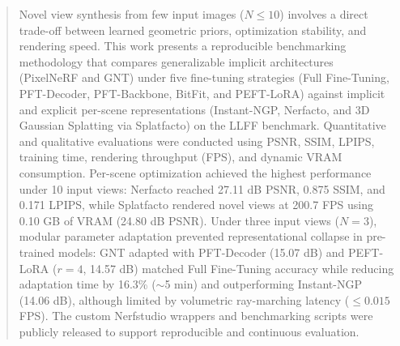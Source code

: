 \documentclass[10pt,conference]{IEEEtran}
\begin{document}
\begin{abstract}
Novel view synthesis from few input images ($N \le 10$) involves a direct trade-off between learned geometric priors, optimization stability, and rendering speed. This work presents a reproducible benchmarking methodology that compares generalizable implicit architectures (PixelNeRF and GNT) under five fine-tuning strategies (Full Fine-Tuning, PFT-Decoder, PFT-Backbone, BitFit, and PEFT-LoRA) against implicit and explicit per-scene representations (Instant-NGP, Nerfacto, and 3D Gaussian Splatting via Splatfacto) on the LLFF benchmark. Quantitative and qualitative evaluations were conducted using PSNR, SSIM, LPIPS, training time, rendering throughput (FPS), and dynamic VRAM consumption. Per-scene optimization achieved the highest performance under 10 input views: Nerfacto reached 27.11 dB PSNR, 0.875 SSIM, and 0.171 LPIPS, while Splatfacto rendered novel views at 200.7 FPS using 0.10 GB of VRAM (24.80 dB PSNR). Under three input views ($N=3$), modular parameter adaptation prevented representational collapse in pre-trained models: GNT adapted with PFT-Decoder (15.07 dB) and PEFT-LoRA ($r=4$, 14.57 dB) matched Full Fine-Tuning accuracy while reducing adaptation time by 16.3\% ($\sim$5 min) and outperforming Instant-NGP (14.06 dB), although limited by volumetric ray-marching latency ($\le 0.015$ FPS). The custom Nerfstudio wrappers and benchmarking scripts were publicly released to support reproducible and continuous evaluation.
\end{abstract}

\IEEEpeerreviewmaketitle











\end{document}
